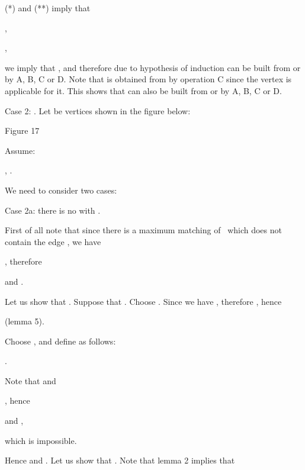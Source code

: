 \documentclass{article}
\begin{document}
(*) and (**) imply that

\begin{center}
,

,
\end{center}

we imply that , and therefore due to hypothesis of induction  can be built from  or  by A,
B, C or D. Note that  is obtained from 
by operation C since the vertex  is applicable for it. This shows that 
can also be built from  or  by A, B, C or D.

Case 2: . Let  be vertices shown in
the figure below:

\begin{center}

Figure 17\bigskip
\end{center}

Assume:

\begin{center}
, .
\end{center}

We need to consider two cases:

Case 2a: there is no  with .

First of all note that since there is a maximum matching of \  which does
not contain the edge , we have

\begin{center}
, therefore

 and .
\end{center}

Let us show that . Suppose that . Choose . Since  we have , therefore , hence

\begin{center}
 (lemma 5).
\end{center}

Choose , and define  as
follows:

\begin{center}
.
\end{center}

Note that  and

\begin{center}
, hence

 and ,
\end{center}

which is impossible.

Hence  and . Let us show that . Note that lemma 2 implies that
\end{document}
